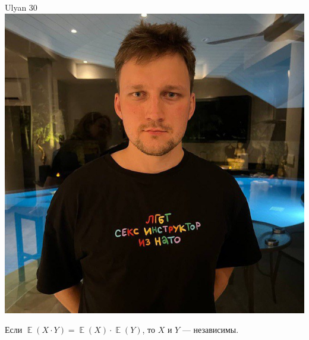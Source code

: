 \documentclass[12pt]{article}
\DeclareMathOperator{\E}{\mathbb{E}}
\begin{document}
\begin{minipage}{0.45\textwidth}
\begin{tinderm}{Ulyan 30}
\includegraphics[width=\textwidth]{tinder-photo/filipp.jpg}

  

\begin{mybox}
 Если $\E(X \cdot Y) = \E(X) \cdot \E(Y)$, то $X$ и $Y$ — независимы.
\end{mybox}
\end{tinderm}
\end{minipage}
\end{document}

